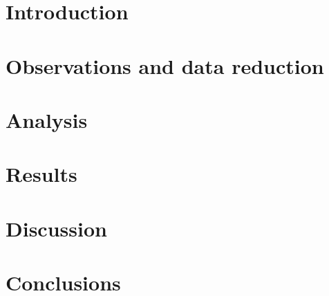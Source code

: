 \documentclass[twocolumn,tighten]{aastex62}
\newcommand{\mynote}[1]{
    {\sffamily\small\color{red}#1}
}
\begin{document}
\title{}

\author{Laurel Farris}

\author{R. T. James McAteer}


\begin{abstract}
    
\end{abstract}


\section{Introduction}\label{introduction}


\clearpage
\section{Observations and data reduction}\label{data}


\clearpage
\section{Analysis}\label{analysis}


\clearpage
\section{Results}\label{results}


\clearpage
\section{Discussion}\label{discussion}


\clearpage
\section{Conclusions}\label{conclusions}



\clearpage

\end{document}
